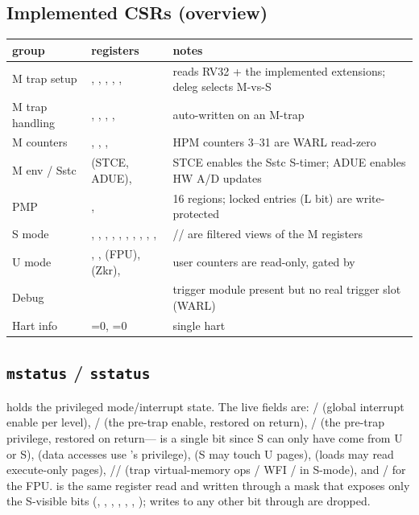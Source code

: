 \subsection{Implemented CSRs (overview)}
\begin{center}\small
\begin{tabularx}{\textwidth}{l Y Y}
\toprule
\textbf{group} & \textbf{registers} & \textbf{notes} \\
\midrule
M trap setup   & , , , , ,  &  reads RV32 + the implemented extensions; deleg selects M-vs-S \\
M trap handling& , , , ,  &  auto-written on an M-trap \\
M counters     & , , ,  & HPM counters 3--31 are WARL read-zero \\
M env / Sstc   &  (STCE, ADUE),  & STCE enables the Sstc S-timer; ADUE enables HW A/D updates \\
PMP            & ,  & 16 regions; locked entries (L bit) are write-protected \\
S mode         & , , , , , , , , , ,  & // are filtered views of the M registers \\
U mode         & , ,  (FPU),  (Zkr),  & user counters are read-only, gated by  \\
Debug          &  & trigger module present but no real trigger slot (WARL) \\
Hart info      & =0, =0 & single hart \\
\bottomrule
\end{tabularx}
\end{center}

\subsection{\texttt{mstatus} / \texttt{sstatus}}
 holds the privileged mode/interrupt state. The live fields are:
/ (global interrupt enable per level), /
(the pre-trap enable, restored on return), / (the pre-trap
privilege, restored on return--- is a single bit since S can only have
come from U or S),  (data accesses use 's privilege),
 (S may touch U pages),  (loads may read execute-only pages),
// (trap virtual-memory ops / WFI /  in
S-mode), and / for the FPU.  is the same
register read and written through a mask that exposes only the S-visible bits
(, , , , , , );
writes to any other bit through  are dropped.

